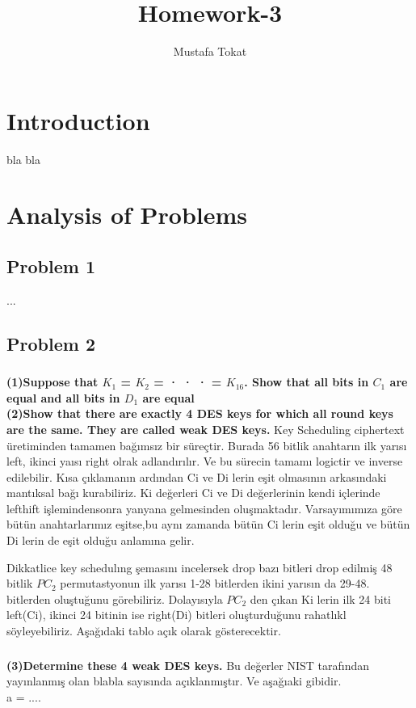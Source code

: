 \documentclass[11pt]{article}
\begin{document}
\title{Homework-3}
\author{Mustafa Tokat}
\maketitle
\section{Introduction}
bla bla

\section{Analysis of Problems}
\subsection{Problem 1}

...

\subsection{Problem 2}
\subsubsection{}
\textbf{(1)Suppose that $K_{1}$ = $K_{2}$ = · · · = $K_{16}$. Show that all bits in $C_{1}$ are equal and all bits in $D_{1}$
are equal}\\
\textbf{(2)Show that there are exactly 4 DES keys for which all round keys are the same. They are
called weak DES keys.} 
Key Scheduling ciphertext üretiminden tamamen bağımsız bir süreçtir. Burada 56 bitlik anahtarın ilk yarısı left, ikinci yaısı right olrak adlandırılır. Ve bu sürecin tamamı logictir ve inverse edilebilir. Kısa çıklamanın ardından Ci ve Di lerin eşit olmasının arkasındaki mantıksal bağı kurabiliriz.  Ki değerleri Ci ve Di değerlerinin kendi içlerinde lefthift işlemindensonra yanyana gelmesinden oluşmaktadır.
Varsayımımıza göre bütün anahtarlarımız eşitse,bu aynı zamanda bütün Ci lerin eşit olduğu ve bütün Di 
 lerin de eşit olduğu  anlamına gelir. 

Dikkatlice key schedulıng şemasını incelersek drop bazı bitleri drop edilmiş 48 bitlik $PC_{2}$ permutastyonun  ilk yarısı 1-28 bitlerden ikini yarısın da 29-48. bitlerden oluştuğunu görebiliriz. Dolayısıyla $PC_{2}$ den çıkan Ki lerin ilk 24 biti left(Ci), ikinci 24 bitinin ise right(Di) bitleri oluşturduğunu rahatlıkl söyleyebiliriz.
Aşağıdaki tablo açık olarak gösterecektir. 


\subsubsection{}
\textbf{(3)Determine these 4 weak DES keys.}
Bu değerler NIST tarafından yayınlanmış olan blabla sayısında açıklanmıştır. Ve aşağıaki gibidir.
\\a = ....
\end{document}
